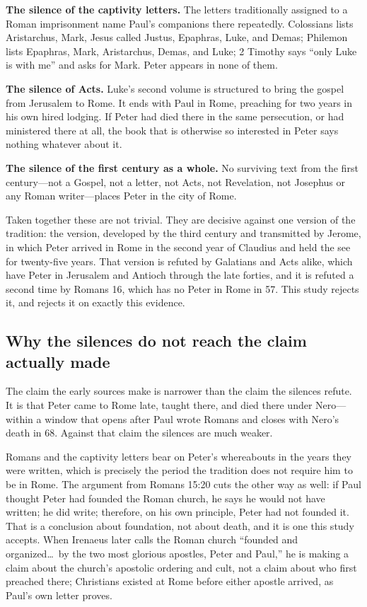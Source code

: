 \textbf{The silence of the captivity letters.} The letters traditionally
assigned to a Roman imprisonment name Paul's companions there repeatedly.
Colossians lists Aristarchus, Mark, Jesus called Justus, Epaphras, Luke, and
Demas; Philemon lists Epaphras, Mark, Aristarchus, Demas, and Luke; 2 Timothy
says ``only Luke is with me'' and asks for Mark. Peter appears in none of
them.

\textbf{The silence of Acts.} Luke's second volume is structured to bring the
gospel from Jerusalem to Rome. It ends with Paul in Rome, preaching for two
years in his own hired lodging. If Peter had died there in the same
persecution, or had ministered there at all, the book that is otherwise so
interested in Peter says nothing whatever about it.

\textbf{The silence of the first century as a whole.} No surviving text from
the first century---not a Gospel, not a letter, not Acts, not Revelation,
not Josephus or any Roman writer---places Peter in the city of Rome.

Taken together these are not trivial. They are decisive against one version
of the tradition: the version, developed by the third century and transmitted
by Jerome, in which Peter arrived in Rome in the second year of Claudius and
held the see for twenty-five years. That version is refuted by Galatians and
Acts alike, which have Peter in Jerusalem and Antioch through the late
forties, and it is refuted a second time by Romans 16, which has no Peter in
Rome in 57. This study rejects it, and rejects it on exactly this evidence.

\subsection{Why the silences do not reach the claim actually made}

The claim the early sources make is narrower than the claim the silences
refute. It is that Peter came to Rome late, taught there, and died there
under Nero---within a window that opens after Paul wrote Romans and closes
with Nero's death in 68. Against that claim the silences are much weaker.

Romans and the captivity letters bear on Peter's whereabouts in the years
they were written, which is precisely the period the tradition does not
require him to be in Rome. The argument from Romans 15:20 cuts the other way
as well: if Paul thought Peter had founded the Roman church, he says he would
not have written; he did write; therefore, on his own principle, Peter had
not founded it. That is a conclusion about foundation, not about death, and
it is one this study accepts. When Irenaeus later calls the Roman church
``founded and organized\ldots\ by the two most glorious apostles, Peter and
Paul,'' he is making a claim about the church's apostolic ordering and cult,
not a claim about who first preached there; Christians existed at Rome before
either apostle arrived, as Paul's own letter proves.

